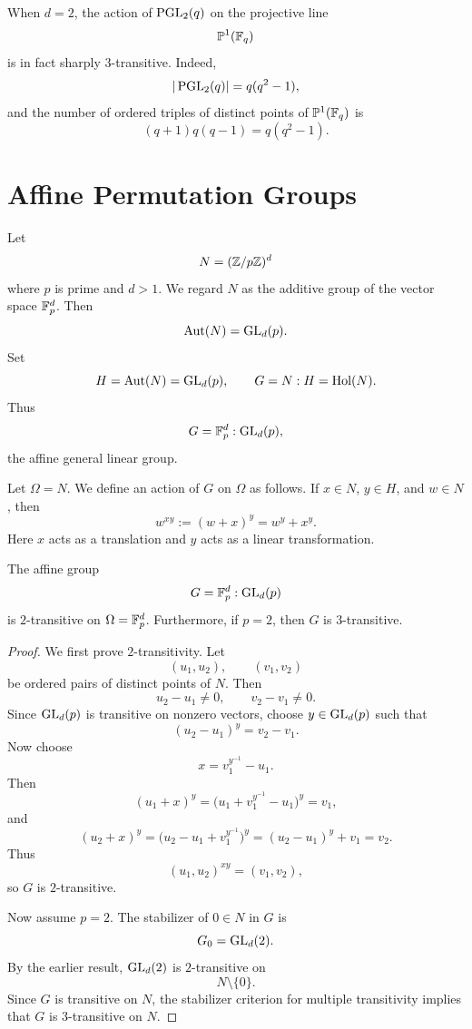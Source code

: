 \begin{remark}
When \(d=2\), the action of \(\operatorname{PGL}_2(q)\) on the projective line
\[
    \mathbb P^1(\mathbb{F}_q)
\]
is in fact sharply \(3\)-transitive. Indeed,
\[
    |\operatorname{PGL}_2(q)|=q(q^2-1),
\]
and the number of ordered triples of distinct points of \(\mathbb P^1(\mathbb{F}_q)\) is
\[
    (q+1)q(q-1)=q(q^2-1).
\]
\end{remark}

\section{Affine Permutation Groups}

Let
\[
    N=(\mathbb{Z}/p\mathbb{Z})^d
\]
where \(p\) is prime and \(d>1\). We regard \(N\) as the additive group of the
vector space \(\mathbb{F}_p^d\). Then
\[
    \operatorname{Aut}(N)=\operatorname{GL}_d(p).
\]
Set
\[
    H=\operatorname{Aut}(N)=\operatorname{GL}_d(p),
    \qquad
    G=N:H=\operatorname{Hol}(N).
\]
Thus
\[
    G=\mathbb{F}_p^d:\operatorname{GL}_d(p),
\]
the affine general linear group.

Let \(\Omega=N\). We define an action of \(G\) on \(\Omega\) as follows. If
\(x\in N\), \(y\in H\), and \(w\in N\), then
\[
    w^{xy}:=(w+x)^y=w^y+x^y.
\]
Here \(x\) acts as a translation and \(y\) acts as a linear transformation.

\begin{theorem}
The affine group
\[
    G=\mathbb{F}_p^d:\operatorname{GL}_d(p)
\]
is \(2\)-transitive on \(\Omega=\mathbb{F}_p^d\).
Furthermore, if \(p=2\), then \(G\) is \(3\)-transitive.
\end{theorem}

\begin{proof}
We first prove \(2\)-transitivity. Let
\[
    (u_1,u_2),\qquad (v_1,v_2)
\]
be ordered pairs of distinct points of \(N\). Then
\[
    u_2-u_1\neq 0,
    \qquad
    v_2-v_1\neq 0.
\]
Since \(\operatorname{GL}_d(p)\) is transitive on nonzero vectors, choose \(y\in \operatorname{GL}_d(p)\)
such that
\[
    (u_2-u_1)^y=v_2-v_1.
\]
Now choose
\[
    x=v_1^{y^{-1}}-u_1.
\]
Then
\[
    (u_1+x)^y
    =
    \bigl(u_1+v_1^{y^{-1}}-u_1\bigr)^y
    =
    v_1,
\]
and
\[
    (u_2+x)^y
    =
    \bigl(u_2-u_1+v_1^{y^{-1}}\bigr)^y
    =
    (u_2-u_1)^y+v_1
    =
    v_2.
\]
Thus
\[
    (u_1,u_2)^{xy}=(v_1,v_2),
\]
so \(G\) is \(2\)-transitive.

Now assume \(p=2\). The stabilizer of \(0\in N\) in \(G\) is
\[
    G_0=\operatorname{GL}_d(2).
\]
By the earlier result, \(\operatorname{GL}_d(2)\) is \(2\)-transitive on
\[
    N\setminus\{0\}.
\]
Since \(G\) is transitive on \(N\), the stabilizer criterion for multiple transitivity
implies that \(G\) is \(3\)-transitive on \(N\).
\end{proof}

